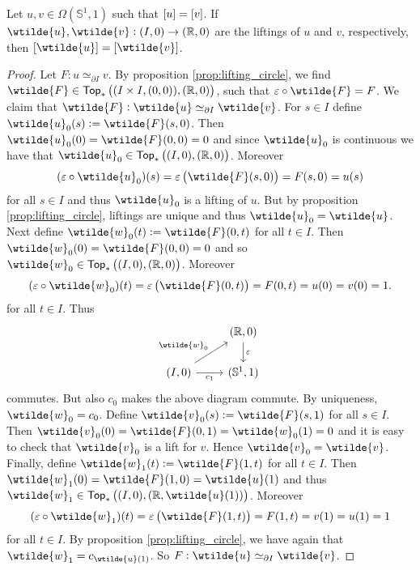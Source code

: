 \begin{corollary}
	Let $u,v \in \Omega(\mathbb{S}^1,1)$ such that $\sbr{u} = \sbr{v}$. If $\wtilde{u},\wtilde{v} : (I,0) \to (\mathbb{R},0)$ are the liftings of $u$ and $v$, respectively, then $\sbr[0]{\wtilde{u}} = \sbr[0]{\wtilde{v}}$.
	\label{cor:degree}
\end{corollary}

\begin{proof}
	Let $F : u \simeq_{\partial I} v$. By proposition \ref{prop:lifting_circle}, we find $\wtilde{F} \in \mathsf{Top}_\ast\del[1]{(I \times I, (0,0)),(\mathbb{R},0)}$, such that $\varepsilon \circ \wtilde{F} = F$. We claim that $\wtilde{F} : \wtilde{u} \simeq_{\partial I} \wtilde{v}$. For $s \in I$ define $\wtilde{u}_0(s) := \wtilde{F}(s,0)$. Then $\wtilde{u}_0(0) = \wtilde{F}(0,0) = 0$ and since $\wtilde{u}_0$ is continuous we have that $\wtilde{u}_0 \in \mathsf{Top}_\ast\del[1]{(I,0),(\mathbb{R},0)}$. Moreover
	\begin{equation*}
		(\varepsilon \circ \wtilde{u}_0)(s) = \varepsilon\del[1]{\wtilde{F}(s,0)} = F(s,0) = u(s)
	\end{equation*}
	\noindent for all $s \in I$ and thus $\wtilde{u}_0$ is a lifting of $u$. But by proposition \ref{prop:lifting_circle}, liftings are unique and thus $\wtilde{u}_0 = \wtilde{u}$. Next define $\wtilde{w}_0(t) := \wtilde{F}(0,t)$ for all $t \in I$. Then $\wtilde{w}_0(0) = \wtilde{F}(0,0) = 0$ and so $\wtilde{w}_0 \in \mathsf{Top}_\ast\del[1]{(I,0),(\mathbb{R},0)}$. Moreover
	\begin{equation*}
		(\varepsilon \circ \wtilde{w}_0)(t) = \varepsilon\del[1]{\wtilde{F}(0,t)} = F(0,t) = u(0) = v(0) = 1.
	\end{equation*}
	\noindent for all $t \in I$. Thus
	\begin{equation*}
		\begin{tikzcd}
			& (\mathbb{R},0) \arrow[d,"\varepsilon"]\\
			(I,0) \arrow[r,"c_1"']\arrow[ur,"\wtilde{w}_0"] & (\mathbb{S}^1,1)		
		\end{tikzcd}
	\end{equation*}
	\noindent commutes. But also $c_0$ makes the above diagram commute. By uniqueness, $\wtilde{w}_0 = c_0$. Define $\wtilde{v}_0(s) := \wtilde{F}(s,1)$ for all $s \in I$. Then $\wtilde{v}_0(0) = \wtilde{F}(0,1) = \wtilde{w}_0(1) = 0$ and it is easy to check that $\wtilde{v}_0$ is a lift for $v$. Hence $\wtilde{v}_0 = \wtilde{v}$. Finally, define $\wtilde{w}_1(t) := \wtilde{F}(1,t)$ for all $t \in I$. Then $\wtilde{w}_1(0) = \wtilde{F}(1,0) = \wtilde{u}(1)$ and thus $\wtilde{w}_1 \in \mathsf{Top}_\ast\del[1]{(I,0),(\mathbb{R},\wtilde{u}(1))}$. Moreover
	\begin{equation*}
		(\varepsilon \circ \wtilde{w}_1)(t) = \varepsilon\del[1]{\wtilde{F}(1,t)} = F(1,t) = v(1) = u(1) = 1
	\end{equation*}
	\noindent for all $t \in I$. By proposition \ref{prop:lifting_circle}, we have again that $\wtilde{w}_1 = c_{\wtilde{u}(1)}$. So $F : \wtilde{u} \simeq_{\partial I} \wtilde{v}$.
\end{proof}

